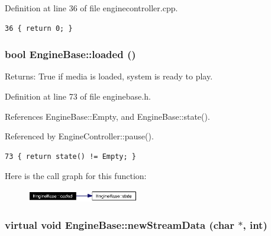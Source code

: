 Definition at line 36 of file enginecontroller.cpp.



\footnotesize\begin{verbatim}36 { return 0; }
\end{verbatim}\normalsize 
{}
\subsubsection{\setlength{\rightskip}{0pt plus 5cm}bool Engine\-Base::loaded ()\hspace{0.3cm}{\tt  [inline, inherited]}}\label{classEngineBase_EngineBasea9}


\begin{Desc}
\item[Returns:]True if media is loaded, system is ready to play. \end{Desc}


Definition at line 73 of file enginebase.h.

References Engine\-Base::Empty, and Engine\-Base::state().

Referenced by Engine\-Controller::pause().



\footnotesize\begin{verbatim}73 { return state() != Empty; }
\end{verbatim}\normalsize 


Here is the call graph for this function:\begin{figure}[H]
\begin{center}
\leavevmode
\includegraphics[width=138pt]{classEngineBase_EngineBasea9_cgraph}
\end{center}
\end{figure}
\subsubsection{\setlength{\rightskip}{0pt plus 5cm}virtual void Engine\-Base::new\-Stream\-Data (char $\ast$, int)\hspace{0.3cm}{\tt  [inline, virtual, slot, inherited]}}\label{classEngineBase_EngineBasei7}




